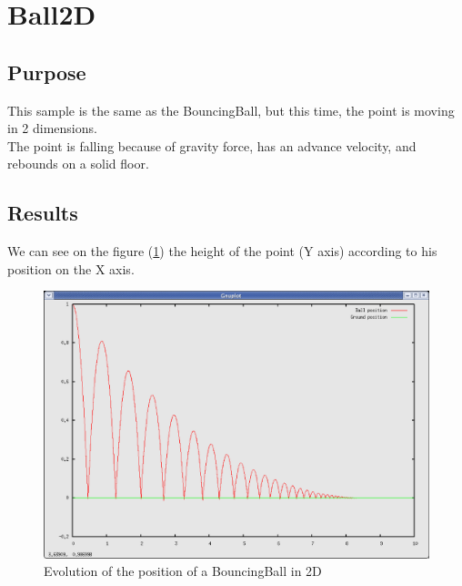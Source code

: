 \pagebreak

\section{Ball2D}
\subsection{Purpose}
This sample is the same as the BouncingBall, but this time, the point is moving in 2 dimensions.\\
The point is falling because of gravity force, has an advance velocity, and rebounds on a solid floor.\\

\subsection{Results}
We can see on the figure (\ref{fig: Ball2D}) the height of the point (Y axis) according to his position on the X axis.
	\begin{figure}
	\begin{center}
	\includegraphics[scale=0.6, clip]{figure/Ball2D.eps}
	\caption{Evolution of the position of a BouncingBall in 2D}
	\label{fig: Ball2D}
	\end{center}
	\end{figure}

\pagebreak

